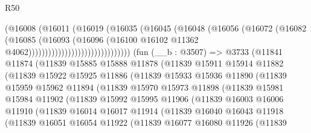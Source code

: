 \begin{lexlean}{R50}
\begin{coremodule}
                                        (@16008
                                          (@16011
                                            (@16019
                                              (@16035
                                                (@16045
                                                  (@16048
                                                    (@16056
                                                      (@16072
                                                        (@16082
                                                          (@16085
                                                            (@16093
                                                              (@16096
                                                                (@16100
                                                                  @16102
                                                                  @11362
                                                                  @4062)))))))))))))))))))))))))))))))
    (fun (__b : @3507) =>
    @3733
      (@11841
        @11874
        (@11839
          @15885
          @15888
          @11878
          (@11839
            @15911
            @15914
            @11882
            (@11839
              @15922
              @15925
              @11886
              (@11839
                @15933
                @15936
                @11890
                (@11839
                  @15959
                  @15962
                  @11894
                  (@11839
                    @15970
                    @15973
                    @11898
                    (@11839
                      @15981
                      @15984
                      @11902
                      (@11839
                        @15992
                        @15995
                        @11906
                        (@11839
                          @16003
                          @16006
                          @11910
                          (@11839
                            @16014
                            @16017
                            @11914
                            (@11839
                              @16040
                              @16043
                              @11918
                              (@11839
                                @16051
                                @16054
                                @11922
                                (@11839
                                  @16077
                                  @16080
                                  @11926
                                  (@11839

\end{coremodule}
\end{lexlean}

